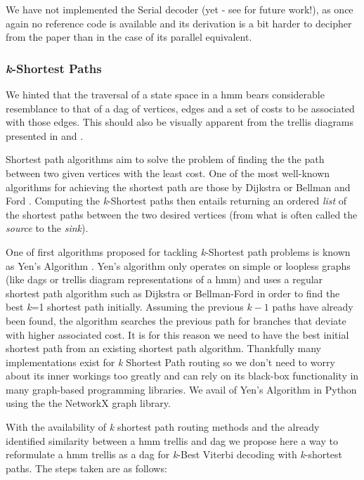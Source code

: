 {{{{{{{{We have not implemented the Serial decoder (yet - see  for future work!), as once again no reference code is available and its derivation is a bit harder to decipher from the paper than in the case of its parallel equivalent.

\subsubsection{\textit{k}-Shortest Paths}

We hinted that the traversal of a state space in a \acrshort{hmm} bears considerable resemblance to that of a \acrfull{dag} of vertices, edges and a set of costs to be associated with those edges. This should also be visually apparent from the trellis diagrams presented in  and .

Shortest path algorithms aim to solve the problem of finding the the path between two given vertices with the least cost. One of the most well-known algorithms for achieving the shortest path are those by Dijkstra or Bellman and Ford \citep{Russell2002}. Computing the \textit{k}-Shortest paths then entails returning an ordered \textit{list} of the shortest paths between the two desired vertices (from what is often called the \textit{source} to the \textit{sink}).

One of first algorithms proposed for tackling \textit{k}-Shortest path problems is known as Yen's Algorithm \citep{Yen1971}. Yen's algorithm only operates on simple or loopless graphs (like \acrshort{dag}s or trellis diagram representations of a \acrshort{hmm}) and uses a regular shortest path algorithm such as Dijkstra or Bellman-Ford in order to find the best \textit{k}=1 shortest path initially. Assuming the previous $k-1$ paths have already been found, the algorithm searches the previous path for branches that deviate with higher associated cost. It is for this reason we need to have the best initial shortest path from an existing shortest path algorithm. Thankfully many implementations exist for \textit{k} Shortest Path routing so we don't need to worry about its inner workings too greatly and can rely on its black-box functionality in many graph-based programming libraries. We avail of Yen's Algorithm in Python using the the NetworkX \cite{Hagberg2008} graph library. 

With the availability of \textit{k} shortest path routing methods and the already identified similarity between a \acrshort{hmm} trellis and \acrshort{dag} we propose here a way to reformulate a \acrshort{hmm} trellis as a \acrshort{dag} for \textit{k}-Best Viterbi decoding with \textit{k}-shortest paths. The steps taken are as follows:

}}}}}}}}
